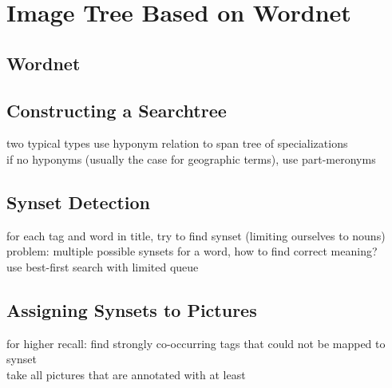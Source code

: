 %
\section{Image Tree Based on Wordnet}
\label{sec_wordnetsearchtree}

\subsection{Wordnet}


\subsection{Constructing a Searchtree}
two typical types 
use hyponym relation to span tree of specializations \\
if no hyponyms (usually the case for geographic terms), use part-meronyms \\

\subsection{Synset Detection}
for each tag and word in title, try to find synset (limiting ourselves to nouns) \\
problem: multiple possible synsets for a word, how to find correct meaning? \\
use best-first search with limited queue

\subsection{Assigning Synsets to Pictures}
for higher recall: find strongly co-occurring tags that could not be mapped to synset \\
take all pictures that are annotated with at least 